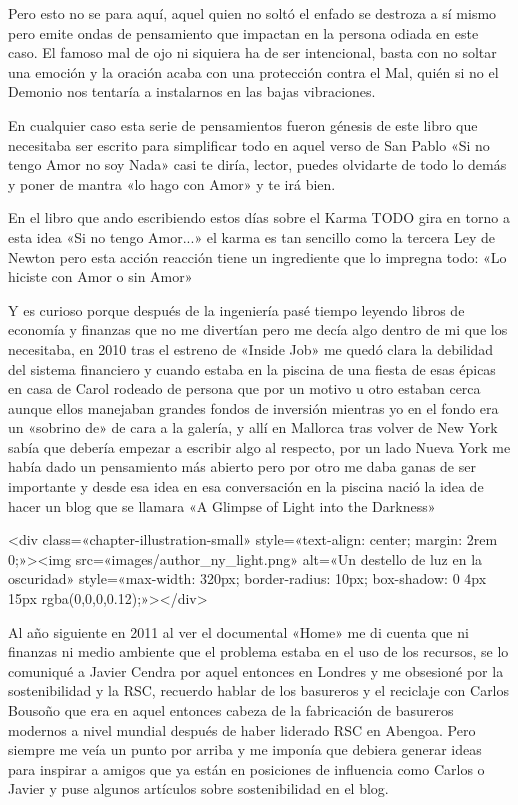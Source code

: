 \documentclass[11pt,a5paper]{book}
\begin{document}
Pero esto no se para aquí, aquel quien no soltó el enfado se destroza a sí mismo pero emite ondas de pensamiento que impactan en la persona odiada en este caso. El famoso mal de ojo ni siquiera ha de ser intencional, basta con no soltar una emoción y la oración acaba con una protección contra el Mal, quién si no el Demonio nos tentaría a instalarnos en las bajas vibraciones. 

En cualquier caso esta serie de pensamientos fueron génesis de este libro que necesitaba ser escrito para simplificar todo en aquel verso de San Pablo «Si no tengo Amor no soy Nada» casi te diría, lector, puedes olvidarte de todo lo demás y poner de mantra «lo hago con Amor» y te irá bien.

En el libro que ando escribiendo estos días sobre el Karma TODO gira en torno a esta idea «Si no tengo Amor...» el karma es tan sencillo como la tercera Ley de Newton pero esta acción reacción tiene un ingrediente que lo impregna todo: «Lo hiciste con Amor o sin Amor» 

Y es curioso porque después de la ingeniería pasé tiempo leyendo libros de economía y finanzas que no me divertían pero me decía algo dentro de mi que los necesitaba, en 2010 tras el estreno de «Inside Job» me quedó clara la debilidad del sistema financiero y cuando estaba en la piscina de una fiesta de esas épicas en casa de Carol rodeado de persona que por un motivo u otro estaban cerca aunque ellos manejaban grandes fondos de inversión mientras yo en el fondo era un «sobrino de» de cara a la galería, y allí en Mallorca tras volver de New York sabía que debería empezar a escribir algo al respecto, por un lado Nueva York me había dado un pensamiento más abierto pero por otro me daba ganas de ser importante y desde esa idea en esa conversación en la piscina nació la idea de hacer un blog que se llamara «A Glimpse of Light into the Darkness»

<div class=«chapter-illustration-small» style=«text-align: center; margin: 2rem 0;»><img src=«images/author_ny_light.png» alt=«Un destello de luz en la oscuridad» style=«max-width: 320px; border-radius: 10px; box-shadow: 0 4px 15px rgba(0,0,0,0.12);»></div>

Al año siguiente en 2011 al ver el documental «Home» me di cuenta que ni finanzas ni medio ambiente que el problema estaba en el uso de los recursos, se lo comuniqué a Javier Cendra por aquel entonces en Londres y me obsesioné por la sostenibilidad y la RSC, recuerdo hablar de los basureros y el reciclaje con Carlos Bousoño que era en aquel entonces cabeza de la fabricación de basureros modernos a nivel mundial después de haber liderado RSC en Abengoa. Pero siempre me veía un punto por arriba y me imponía que debiera generar ideas para inspirar a amigos que ya están en posiciones de influencia como Carlos o Javier y puse algunos artículos sobre sostenibilidad en el blog.
\end{document}
